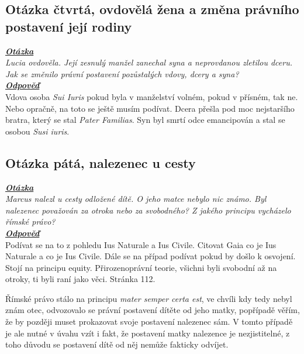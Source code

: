 \documentclass{article}
\begin{document}


\subsection{Otázka čtvrtá, ovdovělá žena a změna právního postavení její rodiny}
\textbf{\textit{\underline{Otázka}}}\\

\textit{Lucia ovdověla. Její zesnulý manžel zanechal syna a neprovdanou zletilou dceru. Jak se změnilo právní postavení pozůstalých vdovy, dcery a syna?}\\

\noindent\textbf{\textit{\underline{Odpověď}}}\\

Vdova osoba \textit{Sui Iuris} pokud byla v manželství volném, pokud v přísném, tak ne. Nebo opračně, na toto se ještě musím podívat. Dcera přešla pod moc nejstaršího bratra, který se stal \textit{Pater Familias}. Syn byl smrtí odce emancipován a stal se osobou \textit{Susi iuris}.

\subsection{Otázka pátá, nalezenec u cesty}
\textbf{\textit{\underline{Otázka}}}\\
\textit{Marcus nalezl u cesty odložené dítě. O jeho matce nebylo nic známo. Byl nalezenec považován za otroka nebo za svobodného? Z jakého principu vycházelo římské právo?}\\

\noindent\noindent\textbf{\textit{\underline{Odpověď}}}\\

Podívat se na to z pohledu Ius Naturale a Ius Civile.
Citovat Gaia co je Ius Naturale a co je Ius Civile.
Dále se na případ podívat pokud by došlo k osvojení.
Stojí na principu equity.
Přirozenoprávní teorie, všichni byli svobodní až na otroky, ti byli raní jako věci.
Stránka 112.

Římské právo stálo na principu \textit{mater semper certa est}, ve chvíli kdy tedy nebyl znám otec, odvozovalo se právní postavení dítěte od jeho matky, popřípadě věřím, že by později muset prokazovat svoje postavení nalezenec sám. V tomto případě je ale nutné v úvahu vzít i fakt, že postavení matky nalezence je nezjistitelné, z toho důvodu se postavení dítě od něj nemůže fakticky odvíjet.\\
\end{document}
